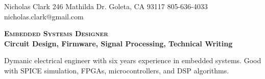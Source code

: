 \documentclass[letterpaper, 10pt]{article}
\begin{document}
\nrctitle
{Nicholas Clark}
{246 Mathilda Dr.}
{Goleta, CA 93117}
{805-636-4033}
{nicholas.clark@gmail.com}
%
\begin{center}
\Large \textbf{\textsc{Embedded Systems Designer}}\\
\large \textbf{{Circuit Design, Firmware, Signal Processing, Technical Writing}}\par
\smallskip
\noindent \begin{minipage}[t]{0.75\textwidth}%
\begin{sloppypar}
Dymanic electrical engineer with six years experience in embedded systems. 
Good with SPICE simulation, FPGAs, microcontrollers, and DSP algorithms.
\end{sloppypar}
\end{minipage}
\end{center}
\par \bigskip
\end{document}
